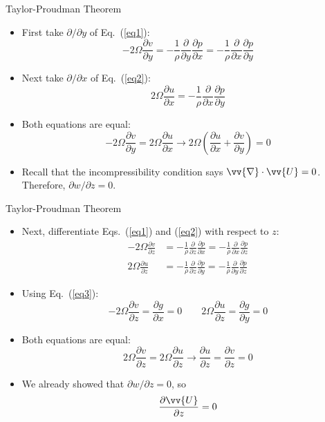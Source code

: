 \begin{frame}{Taylor-Proudman Theorem}

\begin{itemize}
	\item First take $\partial/\partial y$ of Eq.~(\ref{eq1}):
	$$-2\Omega \frac{\partial v}{\partial y} = -\frac{1}{\rho}\frac{\partial}{\partial y}\frac{\partial p}{\partial x} = -\frac{1}{\rho}\frac{\partial}{\partial x}\frac{\partial p}{\partial y}$$
	\item Next take $\partial/\partial x$ of Eq.~(\ref{eq2}):
	$$2\Omega \frac{\partial u}{\partial x} = -\frac{1}{\rho}\frac{\partial}{\partial x}\frac{\partial p}{\partial y}$$
	\item Both equations are equal:
	$$-2\Omega \frac{\partial v}{\partial y} = 2\Omega \frac{\partial u}{\partial x}\rightarrow 2\Omega\left(\frac{\partial u}{\partial x} + \frac{\partial v}{\partial y}\right) = 0$$
	\item Recall that the incompressibility condition says $\vv{\nabla}\cdot\vv{U}=0$. Therefore, $\partial w/\partial z = 0$.
\end{itemize}
\end{frame}

\begin{frame}{Taylor-Proudman Theorem}

\begin{itemize}
	\item Next, differentiate Eqs.~(\ref{eq1}) and (\ref{eq2}) with respect to $z$:
	\begin{align*}
		-2\Omega \frac{\partial v}{\partial z} &= -\frac{1}{\rho}\frac{\partial}{\partial z}\frac{\partial p}{\partial x} = -\frac{1}{\rho}\frac{\partial}{\partial x}\frac{\partial p}{\partial z}\\
		2\Omega \frac{\partial u}{\partial z} &= -\frac{1}{\rho}\frac{\partial}{\partial z}\frac{\partial p}{\partial y} = -\frac{1}{\rho}\frac{\partial}{\partial y}\frac{\partial p}{\partial z}
	\end{align*}
	\item Using Eq.~(\ref{eq3}):
	$$
		-2\Omega \frac{\partial v}{\partial z} = \frac{\partial g}{\partial x} = 0 \qquad 
		2\Omega \frac{\partial u}{\partial z} = \frac{\partial g}{\partial y} = 0
	$$
	\item Both equations are equal:
	$$2\Omega \frac{\partial v}{\partial z} = 2\Omega \frac{\partial u}{\partial z} \rightarrow \frac{\partial u}{\partial z} = \frac{\partial v}{\partial z} = 0$$
	\item We already showed that $\partial w/\partial z=0$, so
	$$\frac{\partial \vv{U}}{\partial z} = 0$$
\end{itemize}
\end{frame}

